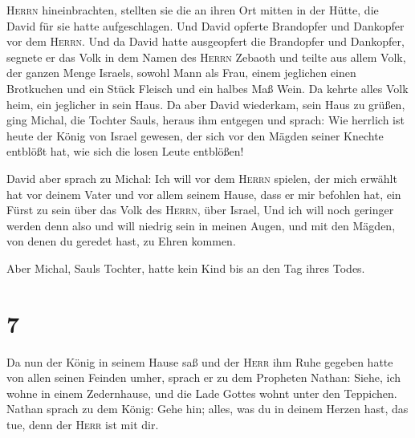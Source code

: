 \textsc{Herrn} hineinbrachten, stellten sie die an ihren Ort mitten in
der Hütte, die David für sie hatte aufgeschlagen. Und David opferte
Brandopfer und Dankopfer vor dem \textsc{Herrn}.  Und da
David hatte ausgeopfert die Brandopfer und Dankopfer, segnete er das
Volk in dem Namen des \textsc{Herrn} Zebaoth  und teilte
aus allem Volk, der ganzen Menge Israels, sowohl Mann als Frau, einem
jeglichen einen Brotkuchen und ein Stück Fleisch und ein halbes Maß
Wein. Da kehrte alles Volk heim, ein jeglicher in sein Haus.
 Da aber David wiederkam, sein Haus zu grüßen, ging
Michal, die Tochter Sauls, heraus ihm entgegen und sprach: Wie herrlich
ist heute der König von Israel gewesen, der sich vor den Mägden seiner
Knechte entblößt hat, wie sich die losen Leute entblößen!

 David aber sprach zu Michal: Ich will vor dem
\textsc{Herrn} spielen, der mich erwählt hat vor deinem Vater und vor
allem seinem Hause, dass er mir befohlen hat, ein Fürst zu sein über das
Volk des \textsc{Herrn}, über Israel,  Und ich will noch
geringer werden denn also und will niedrig sein in meinen Augen, und mit
den Mägden, von denen du geredet hast, zu Ehren kommen.

 Aber Michal, Sauls Tochter, hatte kein Kind bis an den
Tag ihres Todes.

\hypertarget{section-6}{%
\section{7}\label{section-6}}

 Da nun der König in seinem Hause saß und der
\textsc{Herr} ihm Ruhe gegeben hatte von allen seinen Feinden umher,
 sprach er zu dem Propheten Nathan: Siehe, ich wohne in
einem Zedernhause, und die Lade Gottes wohnt unter den Teppichen.
 Nathan sprach zu dem König: Gehe hin; alles, was du in
deinem Herzen hast, das tue, denn der \textsc{Herr} ist mit dir.

